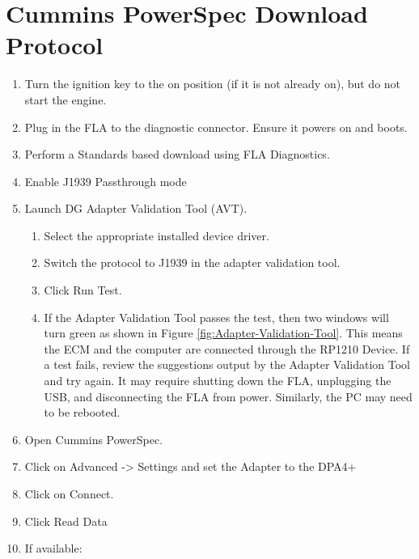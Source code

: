\documentclass[11pt]{article}
\begin{document}
\section{Cummins PowerSpec Download Protocol}
\begin{enumerate}
\item Turn the ignition key to the on position (if it is not already on),
but do not start the engine.
\item Plug in the FLA to the diagnostic connector. Ensure it powers on and
boots.
\item Perform a Standards based download using FLA Diagnostics.
\item Enable J1939 Passthrough mode
\item Launch DG Adapter Validation Tool (AVT). 

\begin{enumerate}
\item Select the appropriate installed device driver. 
\item Switch the protocol to J1939 in the adapter validation tool.
\item Click Run Test.
\item If the Adapter Validation Tool passes the test, then two windows will
turn green as shown in Figure \ref{fig:Adapter-Validation-Tool}.
This means the ECM and the computer are connected through the RP1210
Device. If a test fails, review the suggestions output by the Adapter
Validation Tool and try again. It may require shutting down the FLA,
unplugging the USB, and disconnecting the FLA from power. Similarly,
the PC may need to be rebooted.
\end{enumerate}
\item Open Cummins PowerSpec. 
\item Click on Advanced -> Settings and set the Adapter to the DPA4+
\item Click on Connect.
\item Click Read Data
\item If available:


\end{enumerate}
\end{document}

